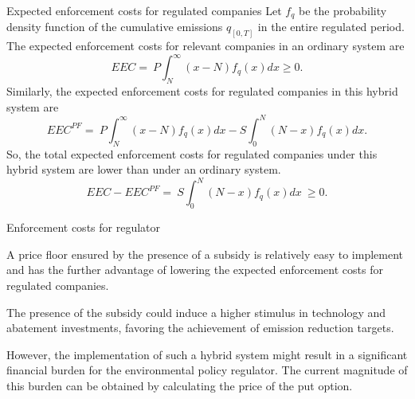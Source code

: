 {Expected enforcement costs for regulated companies}
 Let $f_q$ be the probability density function of the cumulative emissions $q_{[0,T]}$ in the entire regulated period. The expected enforcement costs for relevant companies in an ordinary system are
$$
EEC = \ P \int_N^{\infty} (x-N) f_q(x) dx \ge 0.
$$
Similarly, the expected enforcement costs for regulated companies in this hybrid system are
$$
EEC^{PF} = \ P \int_N^{\infty} (x-N) f_q(x) dx - S \int_0^N (N-x) f_q(x) dx.
$$
So, the total expected enforcement costs for regulated companies under this hybrid system are lower than under an ordinary system.
$$
EEC - EEC^{PF} = \ S \int_0^N (N-x) f_q(x) dx \ \ge 0.
$$

{Enforcement costs for regulator}






	A price floor ensured by the presence of a subsidy is relatively easy to implement and has the further advantage of lowering the expected enforcement costs for regulated companies.


	The presence of the subsidy could induce a higher stimulus in technology and abatement investments, favoring the achievement of emission reduction targets.


	However, the implementation of such a hybrid system might result in a significant financial burden for the environmental policy regulator. The current magnitude of this burden can be obtained by calculating the price of the put option.





